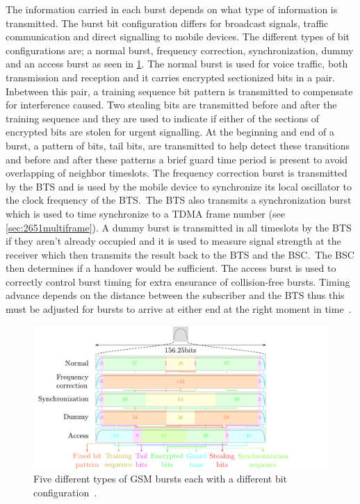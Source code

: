 The information carried in each burst depends on what type of
information is transmitted. The burst bit configuration differs for
broadcast signals, traffic communication and direct signalling to
mobile devices. The different types of bit configurations are; a
normal burst, frequency correction, synchronization, dummy and an
access burst as seen in \cref{fig:burst}. The normal burst is used for
voice traffic, both transmission and reception and it carries
encrypted sectionized bits in a pair. Inbetween this pair, a training
sequence bit pattern is transmitted to compensate for interference
caused. Two stealing bits are transmitted before and after the
training sequence and they are used to indicate if either of the
sections of encrypted bits are stolen for urgent signalling. At the
beginning and end of a burst, a pattern of bits, tail bits, are
transmitted to help detect these transitions and before and after
these patterns a brief guard time period is present to avoid
overlapping of neighbor timeslots. The frequency correction burst is
transmitted by the \gls{BTS} and is used by the mobile device to
synchronize its local oscillator to the clock frequency of the
\gls{BTS}.\ The \gls{BTS} also transmits a synchronization burst which
is used to time synchronize to a \gls{TDMA} frame number (see
\cref{sec:2651multiframe}). A dummy burst is transmitted in all
timeslots by the \gls{BTS} if they aren't already occupied and it is
used to measure signal strength at the receiver which then transmits
the result back to the \gls{BTS} and the \gls{BSC}.\ The \gls{BSC}
then determines if a handover would be sufficient. The access burst is
used to correctly control burst timing for extra ensurance of
collision-free bursts. Timing advance depends on the distance between
the subscriber and the \gls{BTS} thus this must be adjusted for bursts
to arrive at either end at the right moment in
time~\cite[p. 25--26]{gsmtolte}.

\begin{figure}[H]
  \centering
  \includegraphics[width=\textwidth]{figures/burst}
  \caption{Five different types of \gls{GSM} bursts each with a
    different bit configuration~\cite[p. 19--31]{bursts}.}
  \label{fig:burst}
\end{figure}

